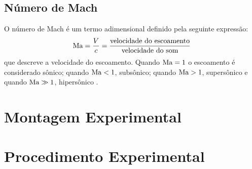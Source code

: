 \subsection{Número de Mach}

O número de Mach é um termo adimensional definido pela seguinte expressão:
%
\begin{equation}
    \text{Ma} = \frac{V}{c} = \frac{\text{velocidade do escoamento}}{\text{velocidade do som}}
    \label{eq:mach}
\end{equation}
%
que descreve a velocidade do escoamento. Quando $\text{Ma} = 1$ o escoamento é considerado sônico; quando $\text{Ma} < 1$, subsônico; quando $\text{Ma} > 1$, supersônico e quando $\text{Ma} \gg 1$, hipersônico \cite{cengel2015mecanica}.
\section{Montagem Experimental}

\section{Procedimento Experimental}